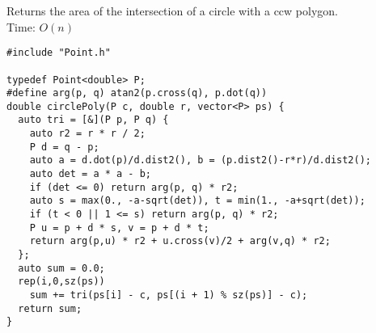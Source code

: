Returns the area of the intersection of a circle with a ccw polygon. \\
Time: $O(n)$
\begin{verbatim}
#include "Point.h"

typedef Point<double> P;
#define arg(p, q) atan2(p.cross(q), p.dot(q))
double circlePoly(P c, double r, vector<P> ps) {
  auto tri = [&](P p, P q) {
    auto r2 = r * r / 2;
    P d = q - p;
    auto a = d.dot(p)/d.dist2(), b = (p.dist2()-r*r)/d.dist2();
    auto det = a * a - b;
    if (det <= 0) return arg(p, q) * r2;
    auto s = max(0., -a-sqrt(det)), t = min(1., -a+sqrt(det));
    if (t < 0 || 1 <= s) return arg(p, q) * r2;
    P u = p + d * s, v = p + d * t;
    return arg(p,u) * r2 + u.cross(v)/2 + arg(v,q) * r2;
  };
  auto sum = 0.0;
  rep(i,0,sz(ps))
    sum += tri(ps[i] - c, ps[(i + 1) % sz(ps)] - c);
  return sum;
}
\end{verbatim}
